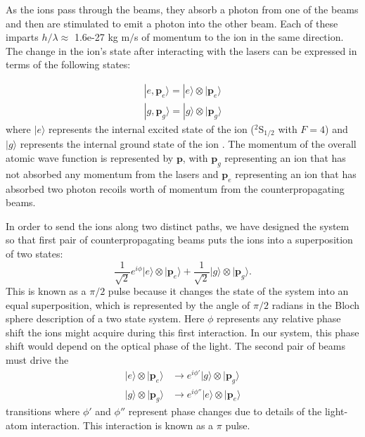 As the ions pass through the beams, they absorb a photon from one of the beams and then are stimulated to emit a photon into the other beam. Each of these imparts $h/\lambda\approx$ 1.6e-27 kg m$/$s of momentum to the ion in the same direction. The change in the ion's state after interacting with the lasers can be expressed in terms of the following states: 

\begin{align}
|e,\mathbf{p}_e\rangle = |e\rangle \otimes |\mathbf{p}_e\rangle \\
|g,\mathbf{p}_g\rangle = |g\rangle \otimes |\mathbf{p}_g\rangle
\end{align} 
where $|e\rangle$ represents the internal excited state of the ion ($^2$S$_{1/2}$ with $F=4$) and $|g\rangle$ represents the internal ground state of the ion \cite{Young1997363}.
 The momentum of the overall atomic wave function is represented by $\mathbf{p}$, with $\mathbf{p}_g$ representing an ion that has not absorbed any momentum from the lasers and $\mathbf{p}_e$ representing an ion that has absorbed two photon recoils worth of momentum from the counterpropagating beams. 

In order to send the ions along two distinct paths, we have designed the system so that first pair of counterpropagating beams puts the ions into a superposition of two states:
\begin{equation}
\frac{1}{\sqrt{2}}e^{i\phi} |e\rangle \otimes |\mathbf{p}_e\rangle +
\frac{1}{\sqrt{2}} |g\rangle \otimes |\mathbf{p}_g\rangle.
\end{equation}
This is known as a $\pi/2$ pulse because it changes the state of the system into an equal superposition, which is represented by the angle of $\pi/2$ radians in the Bloch sphere description of a two state system.
Here $\phi$ represents any relative phase shift the ions might acquire during this first interaction. In our system, this phase shift would depend on the optical phase of the light. The second pair of beams must drive the 
\begin{align}
|e\rangle \otimes |\mathbf{p}_e\rangle &\rightarrow e^{i\phi'} |g\rangle \otimes |\mathbf{p}_g\rangle \\
|g\rangle \otimes |\mathbf{p}_g\rangle & \rightarrow e^{i\phi''}|e\rangle \otimes |\mathbf{p}_e\rangle 
\end{align} 
transitions where $\phi'$ and $\phi''$ represent phase changes due to details of the light-atom interaction. This interaction is known as a $\pi$ pulse.

